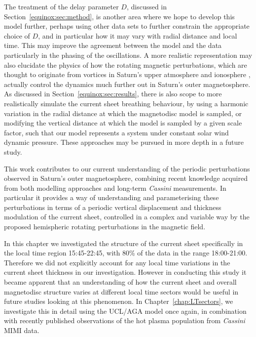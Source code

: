 The treatment of the delay parameter $D$, discussed in Section~\ref{equinox:sec:method}, is another area where we hope to develop this model further, perhaps using other data sets to further constrain the appropriate choice of $D$, and in particular how it may vary with radial distance and local time. This may improve the agreement between the model and the data particularly in the phasing of the oscillations. A more realistic representation may also elucidate the physics of how the rotating magnetic perturbations, which are thought to originate from vortices in Saturn's upper atmosphere and ionosphere \citep[e.g.][]{jiaandkivelson2012}, actually control the dynamics much further out in Saturn's outer magnetosphere. As discussed in Section~\ref{equinox:sec:results}, there is also scope to more realistically simulate the current sheet breathing behaviour, by using a harmonic variation in the radial distance at which the magnetodisc model is sampled, or modifying the vertical distance at which the model is sampled by a given scale factor, such that our model represents a system under constant solar wind dynamic pressure. These approaches may be pursued in more depth in a future study.

This work contributes to our current understanding of the periodic perturbations observed in Saturn's outer magnetosphere, combining recent knowledge acquired from both modelling approaches and long-term \textit{Cassini} measurements. In particular it provides a way of understanding and parameterising these perturbations in terms of a periodic vertical displacement and thickness modulation of the current sheet, controlled in a complex and variable way by the proposed hemispheric rotating perturbations in the magnetic field.

In this chapter we investigated the structure of the current sheet specifically in the local time region 15:45-22:45, with 80\% of the data in the range 18:00-21:00. Therefore  we did not  explicitly account for any local time variations in the current sheet thickness in our investigation. However  in conducting this study it  became apparent that an understanding of how the current sheet and overall magnetodisc structure varies at different local time sectors would  be useful in future studies looking at this phenomenon. In Chapter~\ref{chap:LTsectors}, we investigate this in detail using the UCL/AGA model once again, in combination with recently published observations of the hot plasma population from \textit{Cassini} MIMI data.